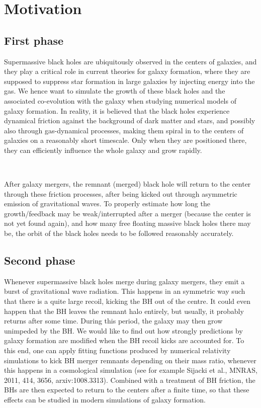 \documentclass[a4,useAMS,usenatbib,usegraphicx,12pt]{article}
\begin{document}
\newpage

\section{Motivation}

\subsection*{First phase}

Supermassive black holes are ubiquitously observed in the centers of galaxies, 
and they play a critical role in current theories for galaxy formation, where 
they are supposed to suppress star formation in large galaxies by injecting 
energy into the gas. We hence want to simulate the growth of these black holes 
and the associated co-evolution with the galaxy when studying numerical models 
of galaxy formation. In reality, it is believed that the black holes experience 
dynamical friction against the background of dark matter and stars, and possibly 
also through gas-dynamical processes, making them spiral in to the centers of 
galaxies on a reasonably short timescale. Only when they are positioned there, 
they can efficiently influence the whole galaxy and grow rapidly. 

\

After galaxy mergers, the remnant (merged) black hole will return to the center 
through these friction processes, after being kicked out through asymmetric 
emission of gravitational waves. To properly estimate how long the growth/feedback 
may be weak/interrupted after a merger (because the center is not yet found again), 
and how many free floating massive black holes there may be, the orbit of the 
black holes needs to be followed reasonably accurately.

\subsection*{Second phase}

Whenever supermassive black holes merge during galaxy mergers, they emit a burst 
of gravitational wave radiation. This happens in an symmetric way such that there
is a quite large recoil, kicking the BH out of the centre. It could even happen 
that the BH leaves the remnant halo entirely, but usually, it probably returns 
after some time. During this period, the galaxy may then grow unimpeded by the BH. 
We would like to find out how strongly predictions by galaxy formation are 
modified when the BH recoil kicks are accounted for. To this end, one can apply 
fitting functions produced by numerical relativity simulations to kick BH merger 
remnants depending on their mass ratio, whenever this happens in a cosmological 
simulation (see for example Sijacki et al., MNRAS, 2011, 414, 3656, arxiv:1008.3313). 
Combined with a treatment of BH friction, the BHs are then expected to return to 
the centers after a finite time, so that these effects can be studied in modern 
simulations of galaxy formation.
\end{document}
